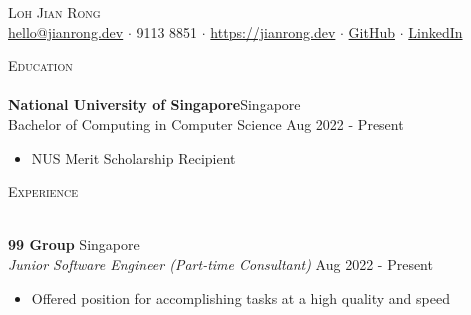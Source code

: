 \documentclass[a4paper]{article}
\newcommand{\lineunder} {
    \vspace*{-8pt} \\
    \hspace*{-12pt} \hrulefill \\
}
\newcommand{\header} [1] {
    {\hspace*{-12pt}\vspace*{6pt} \large\textsc{#1}}
    \vspace*{-6pt} \lineunder
}
\begin{document}
\vspace*{-40pt}

\begin{center}
	{\huge \scshape {Loh Jian Rong}}\\
	\href{mailto:hello@jianrong.dev}{hello@jianrong.dev} $\cdot$ 9113 8851 $\cdot$ \href{https://jianrong.dev}{https://jianrong.dev} $\cdot$ \href{https://github.com/}{GitHub} $\cdot$ \href{https://www.linkedin.com/in/jianrong7/}{LinkedIn}\\
\end{center}

\header{Education}
\vspace{1mm}
\textbf{National University of Singapore}\hfill Singapore\\
Bachelor of Computing in Computer Science \hfill Aug 2022 - Present\\
\vspace{-2mm}
\begin{itemize} \itemsep 1pt
	\item NUS Merit Scholarship Recipient
\end{itemize}

\header{Experience}
\vspace{1mm}

\textbf{99 Group} \hfill Singapore\\
\textit{Junior Software Engineer (Part-time Consultant)} \hfill Aug 2022 - Present\\
\vspace{-2mm}
\begin{itemize} \itemsep 1pt
	\item Offered position for accomplishing tasks at a high quality and speed
\end{itemize}
\end{document}
